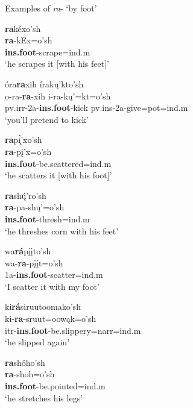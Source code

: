 \begin{exe}
\item\label{ra1examples} Examples of \textit{ra}- `by foot'

	\begin{xlist}
	
	\item \glll \textbf{ra}kéxo'sh\\
	\textbf{ra}-kEx=o'sh\\
	\textbf{ins.foot}-\textnormal{scrape}=ind.m\\
	\glt `he scrapes it [with his feet]' \citep[107]{hollow1970}

	\item \glll óra\textbf{ra}xih írakų'kto'sh\\
	o-ra-\textbf{ra}-xih i-ra-kų'=kt=o'sh\\
	pv.irr-2a-\textbf{ins.foot}-\textnormal{kick} pv.ins-2a-\textnormal{give}=pot=ind.m\\
	\glt `you'll pretend to kick' \citep[62]{hollow1973b}
	
	\item \glll \textbf{ra}pı̨́'xo'sh\\
	\textbf{ra}-pį'x=o'sh\\
	\textbf{ins.foot}-\textnormal{be.scattered}=ind.m\\
	\glt `he scatters it [with his foot]' \citep[146]{hollow1970}

	\item \glll \textbf{ra}shų́'ro'sh\\
	\textbf{ra}-pa-shų'=o'sh\\
	\textbf{ins.foot}-\textnormal{thresh}=ind.m\\
	\glt `he threshes corn with his feet' \citep[221]{hollow1970}

	\item \glll wa\textbf{rá}pįįto'sh\\
	wa-\textbf{ra}-pįįt=o'sh\\
	1a-\textbf{ins.foot}-\textnormal{scatter}=ind.m\\
	\glt `I scatter it with my foot' \citep[464]{hollow1970}

	\item \glll ki\textbf{rá}siruutoomako'sh\\
	ki-\textbf{ra}-sruut=oowąk=o'sh\\
	itr-\textbf{ins.foot}-\textnormal{be.slippery}=narr=ind.m\\
	\glt 	`he slipped again' \citep[11]{kennard1936}

	\item \glll \textbf{ra}shóho'sh\\
	\textbf{ra}-shoh=o'sh\\
	\textbf{ins.foot}-\textnormal{be.pointed}=ind.m\\
	\glt `he stretches his legs' \citep[232]{hollow1970}
	
	\end{xlist}

\end{exe}

